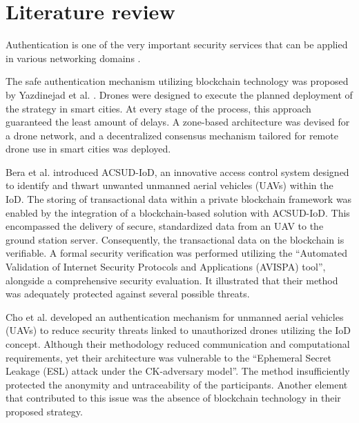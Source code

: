 \section{Literature review}

Authentication is one of the very important security services that can be applied in various networking domains .

The safe authentication mechanism utilizing blockchain technology was proposed by Yazdinejad et al. . Drones were designed to execute the planned deployment of the strategy in smart cities. At every stage of the process, this approach guaranteed the least amount of delays. A zone-based architecture was devised for a drone network, and a decentralized consensus mechanism tailored for remote drone use in smart cities was deployed.

Bera et al. introduced ACSUD-IoD, an innovative access control system designed to identify and thwart unwanted unmanned aerial vehicles (UAVs) within the IoD. The storing of transactional data within a private blockchain framework was enabled by the integration of a blockchain-based solution with ACSUD-IoD. This encompassed the delivery of secure, standardized data from an UAV to the ground station server. Consequently, the transactional data on the blockchain is verifiable. A formal security verification was performed utilizing the ``Automated Validation of Internet Security Protocols and Applications (AVISPA) tool'', alongside a comprehensive security evaluation. It illustrated that their method was adequately protected against several possible threats.


Cho et al. developed an authentication mechanism for unmanned aerial vehicles (UAVs) to reduce security threats linked to unauthorized drones utilizing the IoD concept. Although their methodology reduced communication and computational requirements, yet their architecture was vulnerable to the ``Ephemeral Secret Leakage (ESL) attack under the CK-adversary model''. The method insufficiently protected the anonymity and untraceability of the participants. Another element that contributed to this issue was the absence of blockchain technology in their proposed strategy.

